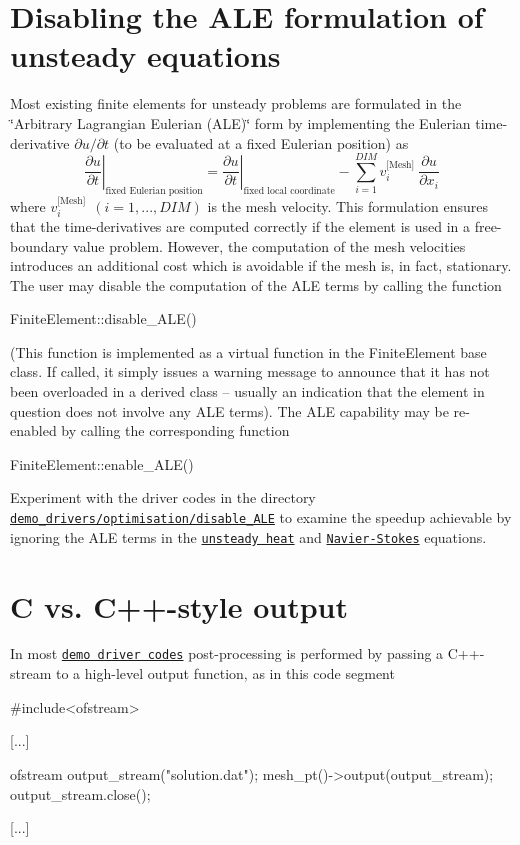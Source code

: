  

\hypertarget{index_ale}{}\section{Disabling the A\+L\+E formulation of unsteady equations}\label{index_ale}
Most existing finite elements for unsteady problems are formulated in the \char`\"{}\+Arbitrary Lagrangian Eulerian (\+A\+L\+E)\char`\"{} form by implementing the Eulerian time-\/derivative $ \partial u /\partial t$ (to be evaluated at a fixed Eulerian position) as \[ \left. \frac{\partial u}{\partial t} \right|_{\mbox{fixed Eulerian position}} = \left. \frac{\partial u}{\partial t} \right|_{\mbox{fixed local coordinate}} - \sum_{i=1}^{DIM} v_i^{\mbox{[Mesh]}} \ \frac{\partial u}{\partial x_i} \] where $ v_i^{\mbox{[Mesh]}} \ \ (i=1,...,DIM)$ is the mesh velocity. This formulation ensures that the time-\/derivatives are computed correctly if the element is used in a free-\/boundary value problem. However, the computation of the mesh velocities introduces an additional cost which is avoidable if the mesh is, in fact, stationary. The user may disable the computation of the A\+LE terms by calling the function 
\begin{DoxyCode}
FiniteElement::disable\_ALE()
\end{DoxyCode}
 (This function is implemented as a virtual function in the {\ttfamily Finite\+Element} base class. If called, it simply issues a warning message to announce that it has not been overloaded in a derived class -- usually an indication that the element in question does not involve any A\+LE terms). The A\+LE capability may be re-\/enabled by calling the corresponding function 
\begin{DoxyCode}
FiniteElement::enable\_ALE()
\end{DoxyCode}


Experiment with the driver codes in the directory \href{../../../demo_drivers/optimisation/disable_ALE}{\tt demo\+\_\+drivers/optimisation/disable\+\_\+\+A\+LE} to examine the speedup achievable by ignoring the A\+LE terms in the \href{../../../demo_drivers/optimisation/disable_ALE/unsteady_heat}{\tt unsteady heat} and \href{../../../demo_drivers/optimisation/disable_ALE/navier_stokes}{\tt Navier-\/\+Stokes} equations.



 

\hypertarget{index_C_style_output}{}\section{C vs. C++-\/style output}\label{index_C_style_output}
In most \href{../../example_code_list/html/index.html}{\tt demo driver codes} post-\/processing is performed by passing a C++-\/stream to a high-\/level output function, as in this code segment 
\begin{DoxyCode}
\textcolor{preprocessor}{#include<ofstream>}

[...]

ofstream output\_stream(\textcolor{stringliteral}{"solution.dat"});
mesh\_pt()->output(output\_stream);
output\_stream.close();

[...]
\end{DoxyCode}


